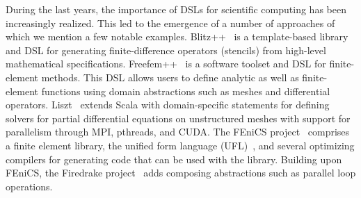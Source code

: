 During the last years, the importance of DSLs for scientific computing has been increasingly 
realized. This led to the emergence of a number of approaches of which
we mention a few notable examples. Blitz++~\cite{veldhuizen_blitz_2000} is a
template-based library and DSL for generating finite-difference operators (stencils)
from high-level mathematical specifications. Freefem++~\cite{hecht_freefem_2012} is a
software toolset and DSL for finite-element methods. This DSL allows
users to define analytic as well as finite-element functions using domain
abstractions such as meshes and differential operators.
Liszt~\cite{devito_liszt_2011} extends Scala with domain-specific statements
for defining solvers for partial differential equations on unstructured meshes with support for parallelism through MPI, pthreads, and CUDA. The
FEniCS project~\cite{logg_automated_2012} comprises a finite element library, the
unified form language (UFL)~\cite{alnaes_ufl_2014}, and several optimizing compilers
for generating code that can be used with the library. Building upon FEniCS, the
Firedrake project~\cite{rathgeber_firedrake_2015} adds composing abstractions such as
parallel loop operations.

